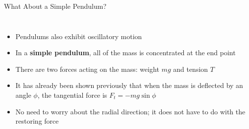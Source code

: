 \documentclass[12pt,compress,aspectratio=169]{beamer}
\begin{document}
\begin{frame}{What About a Simple Pendulum?}
  \begin{columns}
    \begin{itemize}
    \item Pendulums also exhibit oscillatory motion
    \item In a \textbf{simple pendulum}, all of the mass is concentrated at the
      end point 
    \item There are two forces acting on the mass: weight $mg$ and tension $T$
    \item It has already been shown previously that when the mass is deflected
      by an angle $\phi$, the tangential force is $F_t=-mg\sin\phi$
    \item No need to worry about the radial direction; it does not have to do
      with the restoring force
    \end{itemize}

    \centering 
  \end{columns}
\end{frame}
\end{document}
